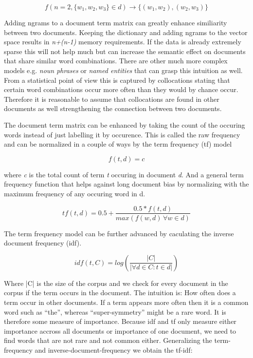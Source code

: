       \begin{equation}
        f(n = 2, \{w_1, w_2, w_3\} \in d) \to \{(w_1, w_2),(w_2,w_3)\}
      \end{equation}

    Adding ngrams to a document term matrix can greatly enhance similiarity between two documents. Keeping the dictionary and adding ngrams to the vector space results in \emph{n+(n-1)} memory requirements. If the data is already extremely sparse this will not help much but can increase the semantic effect on documents that share similar word combinations. There are other much more complex models e.g. \emph{noun phrases} or \emph{named entities} that can grasp this intuition as well. From a statistical point of view this is captured by collocations stating that certain word combinations occur more often than they would by chance occur. Therefore it is reasonable to assume that collocations are found in other documents as well strengthening the connection between two documents.

    The document term matrix can be enhanced by taking the count of the occuring words instead of just labelling it by occurence. This is called the raw frequency and can be normalized in a couple of ways by the term frequency (tf) model
     
      \begin{equation}
        f(t,d) = c
      \end{equation}

    where \emph{c} is the total count of term \emph{t} occuring in document \emph{d}.
    And a general term frequency function that helps against long document bias by normalizing with the maximum frequency of any occuring word in d.

    \begin{equation}
      tf(t,d) = 0.5 + \frac{0.5 * f(t,d)}{max(f(w,d)\, \forall w \in d)}
    \end{equation}

    The term frequency model can be further advanced by caculating the inverse document frequency (idf).

    \begin{equation}
      idf(t, C) = log(\frac{|C|}{|\forall d \in C : t \in d|})
    \end{equation}

    Where |C| is the size of the corpus and we check for every document in the corpus if the term occurs in the document. The intuition is: How often does a term occur in other documents. If a term appears more often then it is a common word such as ``the'', whereas ``super-symmetry'' might be a rare word. It is therefore some measure of importance. Because idf and tf only measure either importance accross all documents or importance of one document, we need to find words that are not rare and not common either. Generalizing the term-frequency and inverse-document-frequency we obtain the tf-idf:

